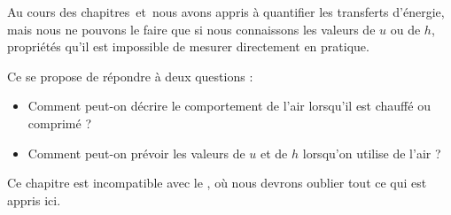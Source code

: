 Au cours des chapitres~\deux et~\trois nous avons appris à quantifier les transferts d’énergie, mais nous ne pouvons le faire que si nous connaissons les valeurs de $u$ ou de $h$, propriétés qu’il est impossible de mesurer directement en pratique.
	
Ce \coursquatre se propose de répondre à deux questions :
\begin{itemize}
	\item Comment peut-on décrire le comportement de l’air lorsqu’il est chauffé ou comprimé ?
	\item Comment peut-on prévoir les valeurs de $u$ et de $h$ lorsqu’on utilise de l’air ?
\end{itemize}
Ce chapitre est incompatible avec le \courscinq, où nous devrons oublier tout ce qui est appris ici.
